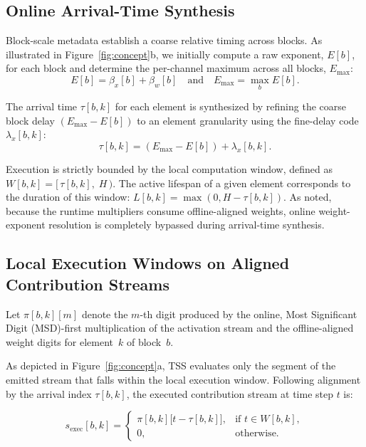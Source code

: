 \documentclass[sigconf]{acmart}
\begin{document}
\subsection{Online Arrival-Time Synthesis}
\label{sec:arrival}

Block-scale metadata establish a coarse relative timing across blocks. As illustrated in Figure~\ref{fig:concept}b, we initially compute a raw exponent, $E[b]$, for each block and determine the per-channel maximum across all blocks, $E_{\max}$:
\begin{equation}
  E[b] = \beta_x[b] + \beta_w[b] \quad \text{and} \quad E_{\max} = \max_{b} E[b].
  \label{eq:eraw_emax}
\end{equation}

The arrival time $\tau[b,k]$ for each element is synthesized by refining the coarse block delay $(E_{\max} - E[b])$ to an element granularity using the fine-delay code~$\lambda_x[b,k]$:
\begin{equation}
  \tau[b,k] = (E_{\max} - E[b]) + \lambda_x[b,k].
  \label{eq:tau}
\end{equation}

Execution is strictly bounded by the local computation window, defined as $W[b,k] = [\,\tau[b,k],\; H\,)$. 
The active lifespan of a given element corresponds to the duration of this window: $L[b,k] = \max(0, H - \tau[b,k])$. 
As noted, because the runtime multipliers consume offline-aligned weights, online weight-exponent resolution is completely bypassed during arrival-time synthesis.

\subsection{Local Execution Windows on Aligned Contribution Streams}
\label{sec:windows}

Let $\pi[b,k][m]$ denote the $m$-th digit produced by the online, Most Significant Digit (MSD)-first multiplication of the activation stream and the offline-aligned weight digits for element~$k$ of block~$b$. 

As depicted in Figure~\ref{fig:concept}a, TSS evaluates only the segment of the emitted stream that falls within the local execution window. Following alignment by the arrival index $\tau[b,k]$, the executed contribution stream at time step $t$ is:

\begin{equation}
s_{\mathrm{exec}}[b,k] =
\begin{cases}
\pi[b,k]\bigl[t - \tau[b,k]\bigr], & \text{if } t \in W[b,k],\\[2pt]
0, & \text{otherwise}.
\end{cases}
\label{eq:sexec}
\end{equation}
\end{document}
